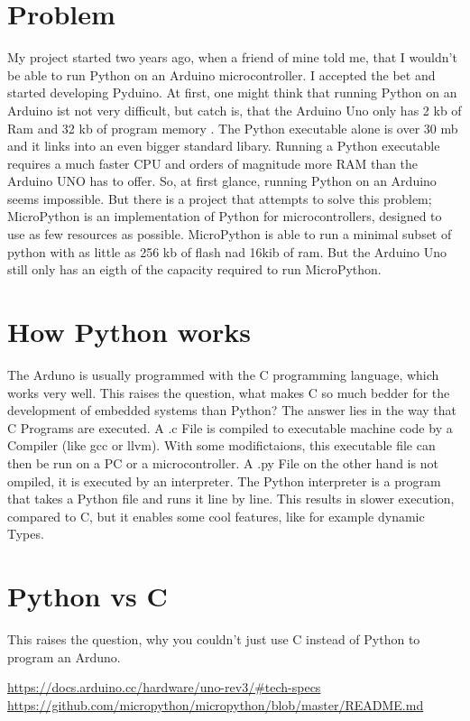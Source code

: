 \documentclass{article}
\begin{document}
\begin{multicols}{2}

\section{Problem}
My project started two years ago, when a friend of mine told me, that I wouldn't be able to run Python on an Arduino microcontroller. I accepted the bet and started developing Pyduino. At first, one might think that running Python on an Arduino ist not very difficult, but catch is, that the Arduino Uno only has 2 kb of Ram and 32 kb of program memory \cite{Q1}. The Python executable alone is over 30 mb and it links into an even bigger standard libary. Running a Python executable requires a much faster CPU and orders of magnitude more RAM than the Arduino UNO has to offer. So, at first glance, running Python on an Arduino seems impossible. But there is a project that attempts to solve this problem; MicroPython is an implementation of Python for microcontrollers, designed to use as few resources as possible. MicroPython is able to run a minimal subset of python with as little as 256 kb of flash nad 16kib of ram. But the Arduino Uno still only has an eigth of the capacity required to run MicroPython.
\section{How Python works}
The Arduno is usually programmed with the C programming language, which works very well. This raises the question, what makes C so much bedder for the development of embedded systems than Python? The answer lies in the way that C Programs are executed. A .c File is compiled to executable machine code by a Compiler (like gcc or llvm). With some modifictaions, this executable file can then be run on a PC or a microcontroller. A .py File on the other hand is not ompiled, it is executed by an interpreter. The Python interpreter is a program that takes a Python file and runs it line by line. This results in slower execution, compared to C, but it enables some cool features, like for example dynamic Types.
\section{Python vs C}
This raises the question, why you couldn't just use C instead of Python to program an Arduno. 



\begin{thebibliography}{99}
\url{https://docs.arduino.cc/hardware/uno-rev3/#tech-specs}
\url{https://github.com/micropython/micropython/blob/master/README.md}
\end{thebibliography}
\end{multicols}
\end{document}
